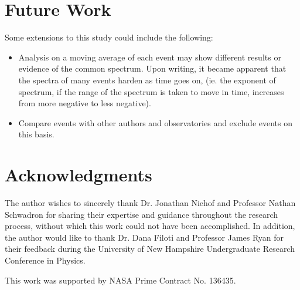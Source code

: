 \documentclass[letterpaper,11pt]{article}
\begin{document}
\section{Future Work}
\label{sec:future}
Some extensions to this study could include the following:

\begin{itemize}
\item Analysis on a moving average of each event may show different results or evidence of the common spectrum.  Upon writing, it became apparent that the spectra of many events harden as time goes on, (ie. the exponent of spectrum, if the range of the spectrum is taken to move in time, increases from more negative to less negative).
\item Compare events with other authors and observatories and exclude events on this basis.
\end{itemize}



\section{Acknowledgments}
The author wishes to sincerely thank Dr. Jonathan Niehof and Professor Nathan Schwadron for sharing their expertise and guidance throughout the research process, without which this work could not have been accomplished. In addition, the author would like to thank Dr. Dana Filoti and Professor James Ryan for their feedback during the University of New Hampshire Undergraduate Research Conference in Physics.

\bigskip

\noindent This work was supported by NASA Prime Contract No. 136435.




%
%

\end{document}
